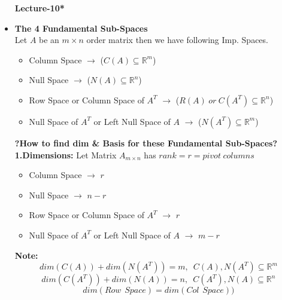 \documentclass[a4paper,11pt]{article}
\numberwithin{equation}{section}
\begin{document}
\begin{itemize}
\vspace{0.1cm}
\begin{center}
    \Huge{\textbf{Lecture-10*}}
\end{center}
\vspace{5pt}

\item \textbf{The 4 Fundamental Sub-Spaces}\\
    Let $A$ be an $m\times n$ order matrix then we have following Imp. Spaces.
\begin{itemize}

    \item Column Space $\rightarrow$ ($C(A)\subseteq \mathbb{R}^m$)
    \item Null Space $\rightarrow$ ($N(A)\subseteq \mathbb{R}^n$)
    \item Row Space or Column Space of $A^T$ $\rightarrow$  ($R(A) \hspace{3pt}or \hspace{3pt}C(A^T)\subseteq \mathbb{R}^n$) 
    \item Null Space of $A^T$ or Left Null Space of $A$ $\rightarrow$ ($N(A^T)\subseteq \mathbb{R}^m$) 
\end{itemize}

\textbf{?How to find dim \& Basis for these Fundamental Sub-Spaces?}\\

\textbf{1.Dimensions:} Let Matrix $A_{m\times n}$ has $rank=r=pivot \hspace{3pt}columns$\\
\begin{itemize}
    \item Column Space $\rightarrow$ $r$
    \item Null Space $\rightarrow$ $n-r$
    \item Row Space or Column Space of $A^T$ $\rightarrow$ $r$
    \item Null Space of $A^T$ or Left Null Space of $A$ $\rightarrow$ $m-r$
\end{itemize}

\textbf{Note: } 
\begin{equation}
    dim(C(A))+dim(N(A^T))=m, \hspace{6pt} C(A),N(A^T)\subseteq \mathbb{R}^m
\end{equation}
\begin{equation}
    dim(C(A^T))+dim(N(A))=n, \hspace{6pt} C(A^T),N(A)\subseteq \mathbb{R}^n
\end{equation}
\begin{equation}
    dim(Row\hspace{5pt} Space)=dim(Col\hspace{5pt} Space))
\end{equation}


\end{itemize}
\end{document}
